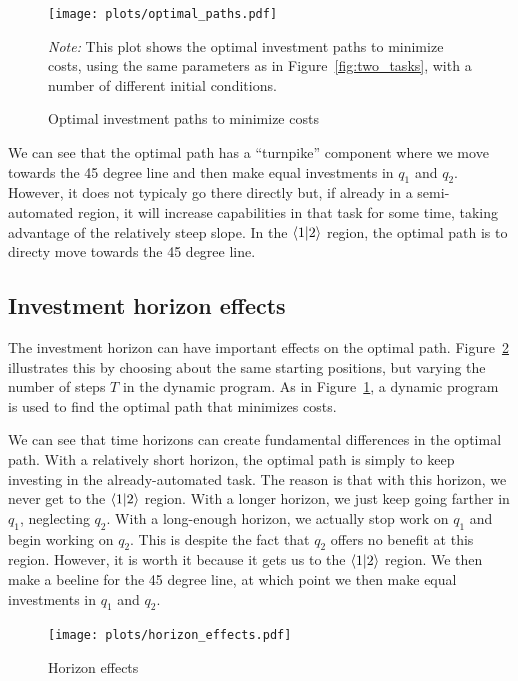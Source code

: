 \documentclass{article}
\begin{document}
\begin{figure}
  \begin{center}
  \caption{Optimal investment paths to minimize costs} \label{fig:optimal_paths}
  \texttt{[image: plots/optimal\_paths.pdf]}
  \end{center}
  \begin{footnotesize}
  \emph{Note:} This plot shows the optimal investment paths to minimize costs, using the same parameters as in Figure~\ref{fig:two_tasks}, with a number of different initial conditions.
\end{footnotesize}
\end{figure}

We can see that the optimal path has a ``turnpike'' component where we move towards the 45 degree line and then make equal investments in $q_1$ and $q_2$.
However, it does not typicaly go there directly but, if already in a semi-automated region, it will increase capabilities in that task for some time, taking advantage of the relatively steep slope. 
In the $\langle 1|2 \rangle$ region, the optimal path is to directy move towards the 45 degree line.

\subsection{Investment horizon effects}
The investment horizon can have important effects on the optimal path.
Figure~\ref{fig:horizon_effects} illustrates this by choosing about the same starting positions, but varying the number of steps $T$ in the dynamic program.
As in Figure~\ref{fig:optimal_paths}, a dynamic program is used to find the optimal path that minimizes costs.

We can see that time horizons can create fundamental differences in the optimal path.
With a relatively short horizon, the optimal path is simply to keep investing in the already-automated task.
The reason is that with this horizon, we never get to the $\langle 1|2 \rangle$ region.
With a longer horizon, we just keep going farther in $q_1$, neglecting $q_2$.
With a long-enough horizon, we actually stop work on $q_1$ and begin working on $q_2$.
This is despite the fact that $q_2$ offers no benefit at this region.
However, it is worth it because it gets us to the $\langle 1|2 \rangle$ region.
We then make a beeline for the 45 degree line, at which point we then make equal investments in $q_1$ and $q_2$.

\begin{figure}
  \begin{center}
  \caption{Horizon effects} \label{fig:horizon_effects}
  \texttt{[image: plots/horizon\_effects.pdf]}
  \end{center}
\end{figure}
\end{document}
